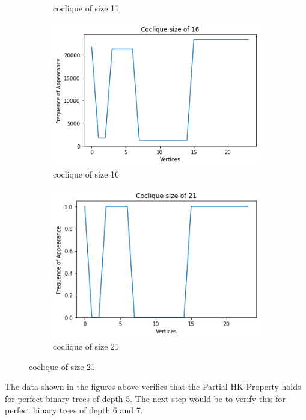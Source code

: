 \documentclass[11pt,a4paper]{article}
\theoremstyle{definition}
\begin{document}
\begin{figure}[hbt!]
\begin{subfigure}{.5\textwidth}
		\caption{coclique of size 11}
	\end{subfigure}
	\begin{subfigure}{.5\textwidth}
		\centering
		\includegraphics[width=1\linewidth]{size_16.png}
		\caption{coclique of size 16}
	\end{subfigure}
	\begin{subfigure}{.5\textwidth}
		\centering
		\includegraphics[width=1\linewidth]{size_21.png}
		\caption{coclique of size 21}
	\end{subfigure}
\end{figure}

The data shown in the figures above verifies that the Partial HK-Property holds for perfect binary trees of depth 5. The next step would be to verify this for perfect binary trees of depth 6 and 7.
\end{document}
